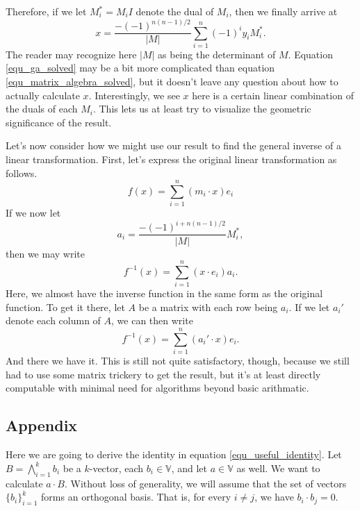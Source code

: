 \documentclass[12pt]{article}
\newcommand{\V}{\mathbb{V}}
\begin{document}
Therefore, if we let $M_i^{*}=M_iI$ denote the dual of $M_i$, then we finally arrive at
\begin{equation}\label{equ_ga_solved}
x = \frac{-(-1)^{n(n-1)/2}}{|M|}\sum_{i=1}^n (-1)^i y_i M_i^{*}.
\end{equation}
The reader may recognize here $|M|$ as being the determinant of $M$.  Equation \eqref{equ_ga_solved}
may be a bit more complicated than equation \eqref{equ_matrix_algebra_solved}, but it doesn't leave
any question about how to actually calculate $x$.  Interestingly, we see $x$ here is a certain linear
combination of the duals of each $M_i$.  This lets us at least try to visualize the geometric significance
of the result.

Let's now consider how we might use our result to find the general inverse of a linear transformation.
First, let's express the original linear transformation as follows.
\begin{equation}
f(x) = \sum_{i=1}^n (m_i\cdot x)e_i
\end{equation}
If we now let
\begin{equation}
a_i = \frac{-(-1)^{i+n(n-1)/2}}{|M|}M_i^{*},
\end{equation}
then we may write
\begin{equation}
f^{-1}(x)=\sum_{i=1}^n (x\cdot e_i)a_i.
\end{equation}
Here, we almost have the inverse function in the same form as the original function.
To get it there, let $A$ be a matrix with each row being $a_i$.  If we let $a_i'$ denote
each column of $A$, we can then write
\begin{equation}
f^{-1}(x)=\sum_{i=1}^n (a_i'\cdot x)e_i.
\end{equation}
And there we have it.  This is still not quite satisfactory, though, because we still had to use some
matrix trickery to get the result, but it's at least directly computable with minimal need for algorithms
beyond basic arithmatic.

\subsection{Appendix}

Here we are going to derive the identity in equation \eqref{equ_useful_identity}.
Let $B=\bigwedge_{i=1}^k b_i$ be a $k$-vector, each $b_i\in\V$, and let $a\in\V$ as well.
We want to calculate $a\cdot B$.  Without loss of generality, we will assume that the set
of vectors $\{b_i\}_{i=1}^k$ forms an orthogonal basis.  That is, for every $i\neq j$, we
have $b_i\cdot b_j=0$.
\end{document}
